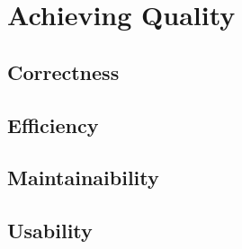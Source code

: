 \documentclass[a4paper,12pt]{article}
\begin{document}
\newpage
\section{\large Achieving Quality}

\subsection{Correctness}


\subsection{Efficiency}

\subsection{Maintainaibility}


\subsection{Usability}
\end{document}
